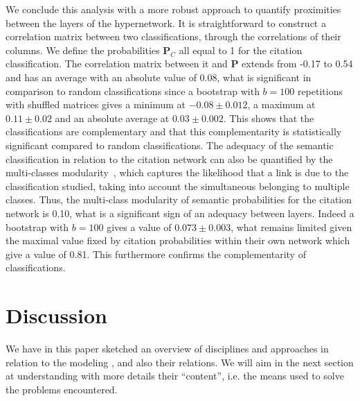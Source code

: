 \documentclass[10pt]{article}
\begin{document}
We conclude this analysis with a more robust approach to quantify proximities between the layers of the hypernetwork. It is straightforward to construct a correlation matrix between two classifications, through the correlations of their columns. We define the probabilities $\mathbf{P}_C$ all equal to 1 for the citation classification. The correlation matrix between it and $\mathbf{P}$ extends from -0.17 to 0.54 and has an average with an absolute value of 0.08, what is significant in comparison to random classifications since a bootstrap with $b=100$ repetitions with shuffled matrices gives a minimum at $-0.08 \pm 0.012$, a maximum at $0.11 \pm 0.02$ and an absolute average at $0.03 \pm 0.002$. This shows that the classifications are complementary and that this complementarity is statistically significant compared to random classifications. The adequacy of the semantic classification in relation to the citation network can also be quantified by the multi-classes modularity~\cite{nicosia2009extending}, which captures the likelihood that a link is due to the classification studied, taking into account the simultaneous belonging to multiple classes. Thus, the multi-class modularity of semantic probabilities for the citation network is 0.10, what is a significant sign of an adequacy between layers. Indeed a bootstrap with $b=100$ gives a value of $0.073 \pm 0.003$, what remains limited given the maximal value fixed by citation probabilities within their own network which give a value of 0.81. This furthermore confirms the complementarity of classifications.







\section{Discussion}



We have in this paper sketched an overview of disciplines and approaches in relation to the modeling , and also their relations. We will aim in the next section at understanding with more details their ``content'', i.e. the means used to solve the problems encountered.
\end{document}

